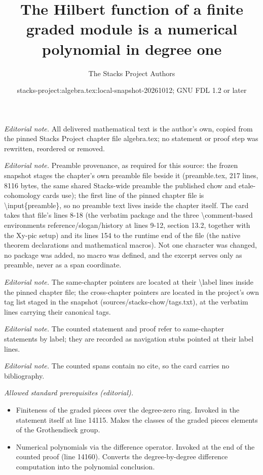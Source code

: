\documentclass[10pt,a4paper]{amsart}
\title{The Hilbert function of a finite graded module is a numerical polynomial in degree one}
\author{The Stacks Project Authors}
\date{stacks-project:algebra.tex:local-snapshot-20261012; GNU FDL 1.2 or later}
\theoremstyle{plain}
\theoremstyle{definition}
\theoremstyle{remark}
\numberwithin{equation}{subsection}
\begin{document}
\maketitle
\noindent\textit{Editorial note.} All delivered mathematical text is the author's own, copied from the pinned Stacks Project chapter file algebra.tex; no statement or proof step was rewritten, reordered or removed.\par\medskip
\noindent\textit{Editorial note.} Preamble provenance, as required for this source: the frozen snapshot stages the chapter's own preamble file beside it (preamble.tex, 217 lines, 8116 bytes, the same shared Stacks-wide preamble the published chow and etale-cohomology cards use); the first line of the pinned chapter file is \textbackslash{}input\{preamble\}, so no preamble text lives inside the chapter itself. The card takes that file's lines 8-18 (the verbatim package and the three \textbackslash{}comment-based environments reference/slogan/history at lines 9-12, section 13.2, together with the Xy-pic setup) and its lines 154 to the runtime end of the file (the native theorem declarations and mathematical macros). Not one character was changed, no package was added, no macro was defined, and the excerpt serves only as preamble, never as a span coordinate.\par\medskip
\noindent\textit{Editorial note.} The same-chapter pointers are located at their \textbackslash{}label lines inside the pinned chapter file; the cross-chapter pointers are located in the project's own tag list staged in the snapshot (sources/stacks-chow/tags.txt), at the verbatim lines carrying their canonical tags.\par\medskip
\noindent\textit{Editorial note.} The counted statement and proof refer to same-chapter statements by label; they are recorded as navigation stubs pointed at their label lines.\par\medskip
\noindent\textit{Editorial note.} The counted spans contain no cite, so the card carries no bibliography.\par\medskip
\noindent\textit{Allowed standard prerequisites (editorial).}\begin{itemize}
\item Finiteness of the graded pieces over the degree-zero ring. Invoked in the statement itself at line 14115. Makes the classes of the graded pieces elements of the Grothendieck group.
\item Numerical polynomials via the difference operator. Invoked at the end of the counted proof (line 14160). Converts the degree-by-degree difference computation into the polynomial conclusion.
\end{itemize}\medskip
\end{document}
